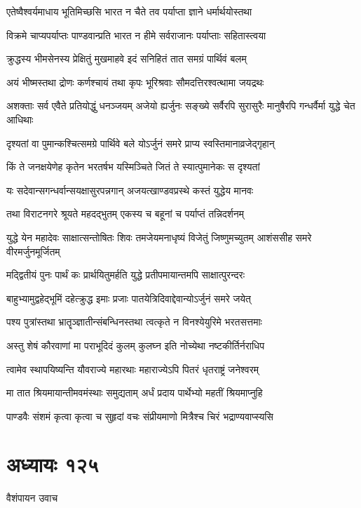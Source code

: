 \twolineshloka
{एतेष्वैश्वर्यमाधाय भूतिमिच्छसि भारत}
{न चैते तव पर्याप्ता ज्ञाने धर्मार्थयोस्तथा}


\twolineshloka
{विक्रमे चाप्यपर्याप्तः पाण्डवान्प्रति भारत}
{न हीमे सर्वराजानः पर्याप्ताः सहितास्त्वया}


\twolineshloka
{क्रुद्धस्य भीमसेनस्य प्रेक्षितुं मुखमाहवे}
{इदं सनिहितं तात समग्रं पार्थिवं बलम्}


\twolineshloka
{अयं भीष्मस्तथा द्रोणः कर्णश्चायं तथा कृपः}
{भूरिश्रवाः सौमदत्तिरश्वत्थामा जयद्रथः}


\threelineshloka
{अशक्ताः सर्व एवैते प्रतियोद्धुं धनञ्जयम्}
{अजेयो ह्यर्जुनः सङ्ख्ये सर्वैरपि सुरासुरैः}
{मानुषैरपि गन्धर्वैर्मा युद्धे चेत आधिथाः}


\twolineshloka
{दृश्यतां वा पुमान्कश्चित्समग्रे पार्थिवे बले}
{योऽर्जुनं समरे प्राप्य स्वस्तिमानाव्रजेद्गृहान्}


\twolineshloka
{किं ते जनक्षयेणेह कृतेन भरतर्षभ}
{यस्मिञ्चिते जितं ते स्यात्पुमानेकः स दृश्यतां}


\twolineshloka
{यः सदेवान्सगन्धर्वान्सयक्षासुरपन्नगान्}
{अजयत्खाण्डवप्रस्थे कस्तं युद्धेय मानवः}


\twolineshloka
{तथा विराटनगरे श्रूयते महदद्भुतम्}
{एकस्य च बहूनां च पर्याप्तं तन्निदर्शनम्}


\threelineshloka
{युद्धे येन महादेवः साक्षात्सन्तोषितः शिवः}
{तमजेयमनाधृष्यं विजेतुं जिष्णुमच्युतम्}
{आशंससीह समरे वीरमर्जुनमूर्जितम्}


\twolineshloka
{मद्द्वितीयं पुनः पार्थं कः प्रार्थयितुमर्हति}
{युद्धे प्रतीपमायान्तमपि साक्षात्पुरन्दरः}


\twolineshloka
{बाहुभ्यामुद्वहेद्भूमिं दहेत्क्रुद्ध इमाः प्रजाः}
{पातयेत्रिदिवाद्देवान्योऽर्जुनं समरे जयेत्}


\twolineshloka
{पश्य पुत्रांस्तथा भ्रातॄञ्ज्ञातीन्संबन्धिनस्तथा}
{त्वत्कृते न विनश्येयुरिमे भरतसत्तमाः}


\twolineshloka
{अस्तु शेषं कौरवाणां मा पराभूदिदं कुलम्}
{कुलघ्न इति नोच्येथा नष्टकीर्तिर्नराधिप}


\twolineshloka
{त्वामेव स्थापयिष्यन्ति यौवराज्ये महारथाः}
{महाराज्येऽपि पितरं धृतराष्ट्रं जनेश्वरम्}


\twolineshloka
{मा तात श्रियमायान्तीमवमंस्थाः समुद्यताम्}
{अर्धं प्रदाय पार्थेभ्यो महतीं श्रियमाप्नुहि}


\twolineshloka
{पाण्डवैः संशमं कृत्वा कृत्वा च सुहृदां वचः}
{संप्रीयमाणो मित्रैश्च चिरं भद्राण्यवाप्स्यसि}


\chapter{अध्यायः १२५}
\twolineshloka
{वैशंपायन उवाच}
{}


